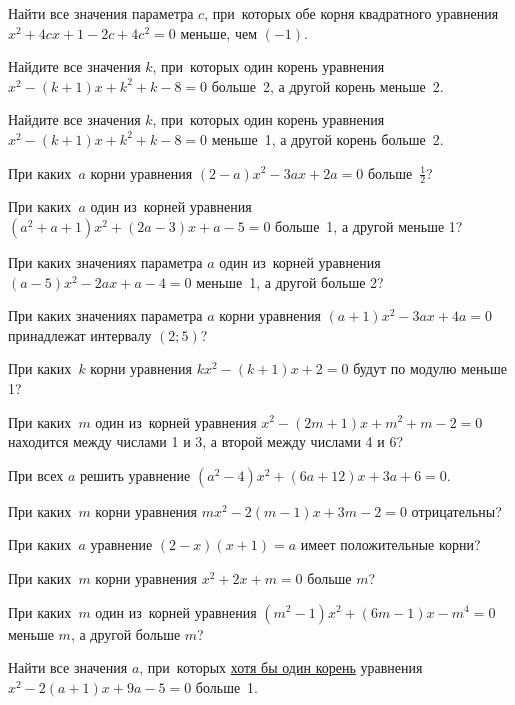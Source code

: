 Найти все значения параметра $c$, при~которых обе корня квадратного уравнения $x^2 + 4cx + 1 -2c + 4c^2 = 0$ меньше, чем $(-1)$.

Найдите все значения $k$, при~которых один корень уравнения 
$x^2 - (k+1)x + k^2 + k - 8 = 0$ больше~2, а другой корень меньше~2.

Найдите все значения $k$, при~которых один корень уравнения 
$x^2 - (k+1)x + k^2 + k - 8 = 0$ меньше~1, а другой корень больше~2.

При каких~$a$ корни уравнения $(2-a)x^2 - 3ax + 2a = 0$ больше~$\frac 12$?
\answer{$a\in\left[\frac{16}{17};2\right)$}

При каких~$a$ один из~корней уравнения 
$(a^2 + a + 1)x^2 + (2a-3)x + a - 5 = 0$ больше~1,
а другой меньше 1?

При каких значениях параметра $a$ один из~корней уравнения 
$(a - 5)x^2 - 2ax + a - 4 = 0$ меньше~1,
а другой больше 2?

При каких значениях параметра $a$ корни уравнения 
$(a + 1)x^2 - 3ax + 4a = 0$ принадлежат интервалу $(2;5)$?
\answer{$a\in\left[-\frac{16}7;-2\right)$}

При каких~$k$ корни уравнения $kx^2 - (k+1)x + 2 = 0$ будут по модулю меньше 1?

При каких~$m$ один из~корней уравнения 
$x^2 - (2m+1)x + m^2 + m -2 = 0$
находится между числами 1 и 3, а второй между числами 4 и 6?

При всех $a$ решить уравнение $(a^2 - 4)x^2 + (6a+12)x + 3a + 6 = 0$.

При каких~$m$ корни уравнения $mx^2 - 2(m-1)x + 3m - 2 = 0$ отрицательны?
\answer{$m\in\left(\frac23;\frac{\sqrt{2}}2\right]$}

При каких~$a$ уравнение $(2-x)(x+1) = a$ имеет положительные корни?

При каких~$m$ корни уравнения $x^2 + 2x + m = 0$ больше $m$?

При каких~$m$ один из~корней уравнения
$(m^2 - 1)x^2 + (6m-1)x - m^4 = 0$
меньше $m$, а другой больше $m$?

Найти все значения $a$, при~которых \underline{хотя бы один корень} уравнения 
$x^2 - 2(a+1)x + 9a - 5 = 0$
больше~1.

